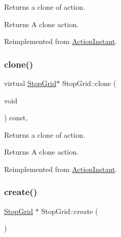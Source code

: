 Returns a clone of action.

\begin{DoxyReturn}{Returns}
A clone action. 
\end{DoxyReturn}


Reimplemented from \hyperlink{classActionInstant_adb76fc6f006098109e8256210cbd8cc0}{Action\+Instant}.

\mbox{\label{classStopGrid_a08d436f2ede344933b7e7914ba5bc16d}} 
\subsubsection{\texorpdfstring{clone()}{clone()}\hspace{0.1cm}{\footnotesize\ttfamily [2/2]}}
{\footnotesize\ttfamily virtual \hyperlink{classStopGrid}{Stop\+Grid}$\ast$ Stop\+Grid\+::clone (\begin{DoxyParamCaption}\item[{void}]{ }\end{DoxyParamCaption}) const\hspace{0.3cm}{\ttfamily [override]}, {\ttfamily [virtual]}}

Returns a clone of action.

\begin{DoxyReturn}{Returns}
A clone action. 
\end{DoxyReturn}


Reimplemented from \hyperlink{classActionInstant_adb76fc6f006098109e8256210cbd8cc0}{Action\+Instant}.

\mbox{\label{classStopGrid_a75cbdf91c486614067c28d051eddafd0}} 
\subsubsection{\texorpdfstring{create()}{create()}\hspace{0.1cm}{\footnotesize\ttfamily [1/2]}}
{\footnotesize\ttfamily \hyperlink{classStopGrid}{Stop\+Grid} $\ast$ Stop\+Grid\+::create (\begin{DoxyParamCaption}{ }\end{DoxyParamCaption})\hspace{0.3cm}{\ttfamily [static]}}



